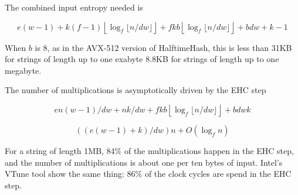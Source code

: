 \documentclass[sigconf, nonacm]{acmart}
\begin{document}
The combined input entropy needed is

\[
e(w-1)
+ k(f-1)\left\lfloor\log_f \lfloor n/dw\rfloor\right\rfloor
+ f k b \left\lfloor\log_f \lfloor n/dw\rfloor\right\rfloor
+ b d w + k - 1
\]

When $b$ is 8, as in the AVX-512 version of HalftimeHash, this is less than 31KB for strings of length up to one exabyte 8.8KB for strings of length up to one megabyte.

The number of multiplications is asymptotically driven by the EHC step

\[
en(w-1)/dw + nk/dw + f k b \left\lfloor\log_f \lfloor n/dw\rfloor\right\rfloor + b d w k
\]

\[
((e(w-1) + k)/dw)n + O(\log_f n)
\]

For a string of length 1MB, 84\% of the multiplications happen in the EHC step, and the number of multiplications is about one per ten bytes of input.
Intel's VTune tool show the same thing: 86\% of the clock cycles are spend in the EHC step.






\end{document}
